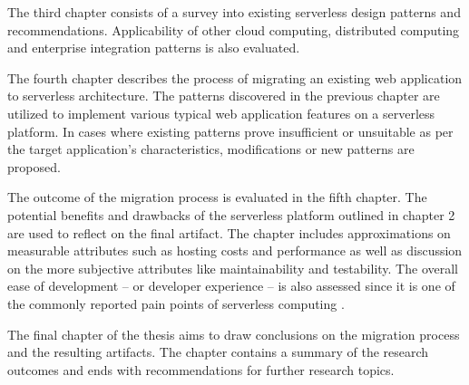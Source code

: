 The third chapter consists of a survey into existing serverless design patterns and recommendations. Applicability of other cloud computing, distributed computing and enterprise integration patterns is also evaluated.

The fourth chapter describes the process of migrating an existing web application to serverless architecture. The patterns discovered in the previous chapter are utilized to implement various typical web application features on a serverless platform. In cases where existing patterns prove insufficient or unsuitable as per the target application's characteristics, modifications or new patterns are proposed.

The outcome of the migration process is evaluated in the fifth chapter. The potential benefits and drawbacks of the serverless platform outlined in chapter 2 are used to reflect on the final artifact. The chapter includes approximations on measurable attributes such as hosting costs and performance as well as discussion on the more subjective attributes like maintainability and testability. The overall ease of development -- or developer experience -- is also assessed since it is one of the commonly reported pain points of serverless computing \parencite{van2017spec}.

The final chapter of the thesis aims to draw conclusions on the migration process and the resulting artifacts. The chapter contains a summary of the research outcomes and ends with recommendations for further research topics.
